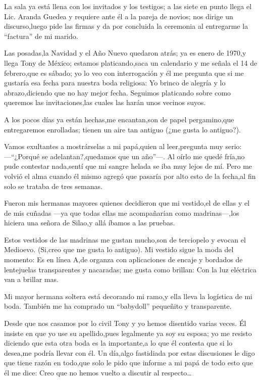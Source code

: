\documentclass[letterpaper,12pt]{book}
\begin{document}
La sala ya está llena con los invitados y los testigos; a las siete en punto llega el Lic. Aranda Guedea y requiere ante él a la pareja de novios; nos dirige un discurso,luego pide las firmas y da por concluida la ceremonia al entregarme la ``factura'' de mi marido.

Las posadas,la Navidad y el Año Nuevo quedaron atrás; ya es enero de 1970,y llega Tony de México; estamos platicando,saca un calendario y me señala el 14 de febrero,que es sábado; yo lo veo con interrogación y él me pregunta que si me gustaría esa fecha para nuestra boda religiosa: Yo brinco de alegría y lo abrazo,diciendo que no hay mejor fecha. Seguimos platicando sobre como queremos las invitaciones,las cuales las harán unos vecinos suyos.

A los pocos días ya están hechas,me encantan,son de papel pergamino,que entregaremos enrolladas; tienen un aire tan antiguo (¿me gusta lo antiguo?).

Vamos exultantes a mostrárselas a mi papá,quien al leer,pregunta muy serio: ---``¿Porqué se adelantan?,quedamos que un año''---. Al oírlo me quedé fría,no pude contestar nada,sentí que mi sangre helada se iba muy lejos de mí. Pero me volvió el alma cuando él mismo agregó que pasaría por alto esto de la fecha,al fin solo se trataba de tres semanas.

Fueron mis hermanas mayores quienes decidieron que mi vestido,el de ellas y el de mis cuñadas ---ya que todas ellas me acompañarían como madrinas---,los hiciera una señora de Silao,y allá íbamos a las pruebas.

Estos vestidos de las madrinas me gustan mucho,son de terciopelo y evocan el Medioevo. (Si,creo que me gusta lo antiguo).  
Mi vestido sigue la moda del momento: Es en línea A,de organza con aplicaciones de encaje y bordados de lentejuelas transparentes y nacaradas; me gusta como brillan: Con la luz eléctrica van a brillar mas.

Mi mayor hermana soltera está decorando mi ramo,y ella lleva la logística de mi boda. También me ha comprado un ``babydoll'' pequeñito y transparente.

Desde que nos casamos por lo civil Tony y yo hemos disentido varias veces. Él insiste en que yo use su apellido,pues legalmente ya soy su esposa; yo me resisto diciendo que esta otra boda es la importante,a lo que él contesta que si lo desea,me podría llevar con él. Un día,algo fastidiada por estas discusiones le digo que tiene razón en todo,que solo le pido que informe a mi papá de todo esto que él me dice: Creo que no hemos vuelto a discutir al respecto\ldots
\end{document}
